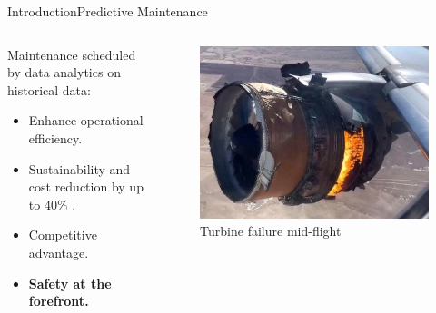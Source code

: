 \documentclass{beamer}
\begin{document}
        \begin{frame}{Introduction}{Predictive Maintenance}
            \begin{columns}
                \begin{column}{0.5\textwidth}
                    Maintenance scheduled by data analytics on historical data:
                    \begin{itemize}
                        \item Enhance operational efficiency.
                        \item Sustainability and cost reduction by up to 40\% \cite{brink-2021}.
                        \item Competitive advantage.
                        \item \textbf{Safety at the forefront.}
                    \end{itemize}
                \end{column}
                \begin{column}{0.5\textwidth}
                    \begin{figure}[!htbp]
                        \centering
                        \includegraphics[scale=0.3]{turbine_failure.jpg}
                        \caption{Turbine failure mid-flight \cite{bbc-news-2021}}
                    \end{figure}
                \end{column}
            \end{columns}
        \end{frame}
\end{document}
